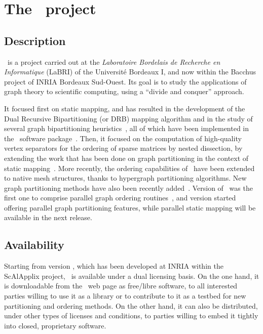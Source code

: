 \section{The \scotch\ project}
\label{sec-project}

\subsection{Description}

\scotch\ is a project carried out at the {\it Laboratoire Bordelais de
Recherche en Informatique\/} (LaBRI) of the Universit\'e Bordeaux I,
and now within the Bacchus project of INRIA Bordeaux Sud-Ouest. Its goal
is to study the applications of graph theory to scientific computing,
using a ``divide and conquer'' approach.

It focused first on static mapping, and has resulted in the
development of the Dual Recursive Bipartitioning (or DRB) mapping
algorithm and in the study of several graph bipartitioning
heuristics~\cite{pell94a}, all of which have been implemented in the
\scotch\ software package~\cite{pero96a}. Then, it focused on the
computation of high-quality vertex separators for the ordering of
sparse matrices by nested dissection, by extending the work that has
been done on graph partitioning in the context of static
mapping~\cite{pero97a,peroam00a}. More recently, the ordering
capabilities of \scotch\ have been extended to native mesh structures,
thanks to hypergraph partitioning algorithms. New graph partitioning
methods have also been recently added~\cite{chpe06a,pell07b}.
Version {} of \scotch\ was the first one to comprise parallel
graph ordering routines~\cite{chpe08}, and version {} started
offering parallel graph partitioning features, while parallel static
mapping will be available in the next release.

\subsection{Availability}

Starting from version {}, which has been developed at INRIA
within the ScAlApplix project, \scotch\ is available under a dual
licensing basis. On the one hand, it is downloadable from the
\scotch\ web page as free/libre software, to all interested parties
willing to use it as a library or to contribute to it as a testbed for
new partitioning and ordering methods. On the other hand, it can also
be distributed, under other types of licenses and conditions, to
parties willing to embed it tightly into closed, proprietary software.
\\

